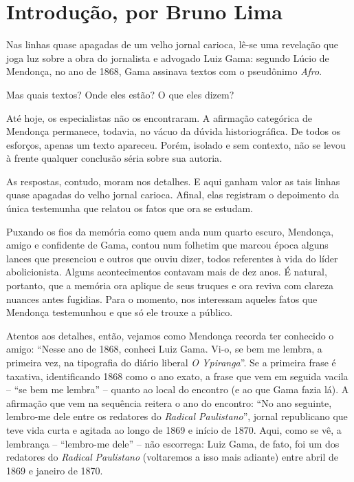 \chapter{Introdução, por Bruno Lima}

Nas linhas quase apagadas de um velho jornal carioca, lê-se uma
revelação que joga luz sobre a obra do jornalista e advogado Luiz Gama:
segundo Lúcio de Mendonça, no ano de 1868, Gama assinava textos com o
pseudônimo \emph{Afro}.

Mas quais textos? Onde eles estão? O que eles dizem?

Até hoje, os especialistas não os encontraram. A afirmação categórica de
Mendonça permanece, todavia, no vácuo da dúvida historiográfica. De
todos os esforços, apenas um texto apareceu. Porém, isolado e sem
contexto, não se levou à frente qualquer conclusão séria sobre sua
autoria.

As respostas, contudo, moram nos detalhes. E aqui ganham valor as tais
linhas quase apagadas do velho jornal carioca. Afinal, elas registram o
depoimento da única testemunha que relatou os fatos que ora se estudam.

Puxando os fios da memória como quem anda num quarto escuro, Mendonça,
amigo e confidente de Gama, contou num folhetim que marcou época alguns
lances que presenciou e outros que ouviu dizer, todos referentes à vida
do líder abolicionista. Alguns acontecimentos contavam mais de dez anos.
É natural, portanto, que a memória ora aplique de seus truques e ora
reviva com clareza nuances antes fugidias. Para o momento, nos
interessam aqueles fatos que Mendonça testemunhou e que só ele trouxe a
público.

Atentos aos detalhes, então, vejamos como Mendonça recorda ter conhecido
o amigo: ``Nesse ano de 1868, conheci Luiz Gama. Vi-o, se bem me lembra,
a primeira vez, na tipografia do diário liberal \emph{O Ypiranga}''. Se a
primeira frase é taxativa, identificando 1868 como o ano exato, a frase
que vem em seguida vacila -- ``se bem me lembra'' -- quanto ao local do
encontro (e ao que Gama fazia lá). A afirmação que vem na sequência
reitera o ano do encontro: ``No ano seguinte, lembro-me dele entre os
redatores do \emph{Radical Paulistano}'', jornal republicano que teve
vida curta e agitada ao longo de 1869 e início de 1870. Aqui, como se
vê, a lembrança -- ``lembro-me dele'' -- não escorrega: Luiz Gama, de
fato, foi um dos redatores do \emph{Radical} \emph{Paulistano}
(voltaremos a isso mais adiante) entre abril de 1869 e janeiro de 1870.

